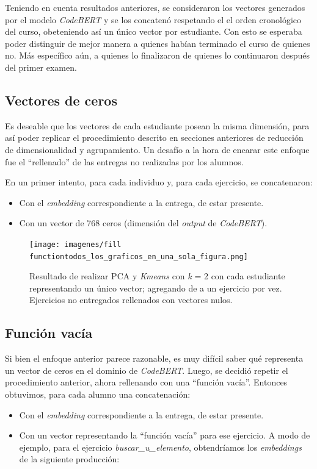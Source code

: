 \documentclass[11pt,a4paper,twoside,openany]{tesis}
\begin{document}
Teniendo en cuenta resultados anteriores, se consideraron los vectores generados por el modelo \emph{CodeBERT} y se los concatenó respetando el el orden cronológico del curso, obeteniendo así un único vector por estudiante. Con esto se esperaba poder distinguir de mejor manera a quienes habían terminado el curso de quienes no. Más específico aún, a quienes lo finalizaron de quienes lo continuaron después del primer examen.


\subsection{Vectores de ceros}

Es deseable que los vectores de cada estudiante posean la misma dimensión, para así poder replicar el procedimiento descrito en secciones anteriores de reducción de dimensionalidad y agrupamiento. Un desafío a la hora de encarar este enfoque fue el ``rellenado'' de las entregas no realizadas por los alumnos.

 En un primer intento, para cada individuo y, para cada ejercicio, se concatenaron:

 \begin{itemize}
     \item Con el \emph{embedding} correspondiente a la entrega, de estar presente.
     \item Con un vector de 768 ceros (dimensión del \emph{output} de \emph{CodeBERT}).
 \end{itemize}

\begin{figure}[H]
    \centering
    \texttt{[image: imagenes/fill functiontodos\_los\_graficos\_en\_una\_sola\_figura.png]}
    \caption{Resultado de realizar PCA y \emph{Kmeans} con \emph{k} = 2 con cada estudiante representando un único vector; agregando de a un ejercicio por vez. Ejercicios no entregados rellenados con vectores nulos.}
    \label{fig: zeros}
\end{figure}

\subsection{Función vacía}
Si bien el enfoque anterior parece razonable, es muy difícil saber qué representa un vector de ceros en el dominio de \emph{CodeBERT}. Luego, se decidió repetir el procedimiento anterior, ahora rellenando con una ``función vacía''. Entonces obtuvimos, para cada alumno una concatenación:


 \begin{itemize}
     \item Con el \emph{embedding} correspondiente a la entrega, de estar presente.
     \item Con un vector representando la ``función vacía'' para ese ejercicio. A modo de ejemplo, para el ejercicio \emph{buscar\_u\_elemento}, obtendríamos los \emph{embeddings} de la siguiente producción:
 \end{itemize}
\end{document}
